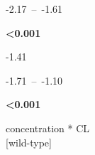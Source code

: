 \documentclass[
  letterpaper,
  DIV=11,
  numbers=noendperiod]{scrartcl}
\begin{document}
\begin{table}
\begin{minipage}[t]{\linewidth}
{}

\end{minipage}%
\newline
\begin{minipage}[t]{\linewidth}

{\centering 

-2.17~--~-1.61

}

\end{minipage}%
\newline
\begin{minipage}[t]{\linewidth}

{\centering 

\textbf{\textless0.001}

}

\end{minipage}%
\newline
\begin{minipage}[t]{\linewidth}

{\centering 

-1.41

}

\end{minipage}%
\newline
\begin{minipage}[t]{\linewidth}

{\centering 

-1.71~--~-1.10

}

\end{minipage}%
\newline
\begin{minipage}[t]{\linewidth}

{\centering 

\textbf{\textless0.001}

}

\end{minipage}%
\newline
\begin{minipage}[t]{\linewidth}

{\centering 

concentration * CL\\
{[}wild-type{]}

}

\end{minipage}%
\newline
\begin{minipage}[t]{\linewidth}

{\centering 

}
\end{minipage}
\end{table}
\end{document}
